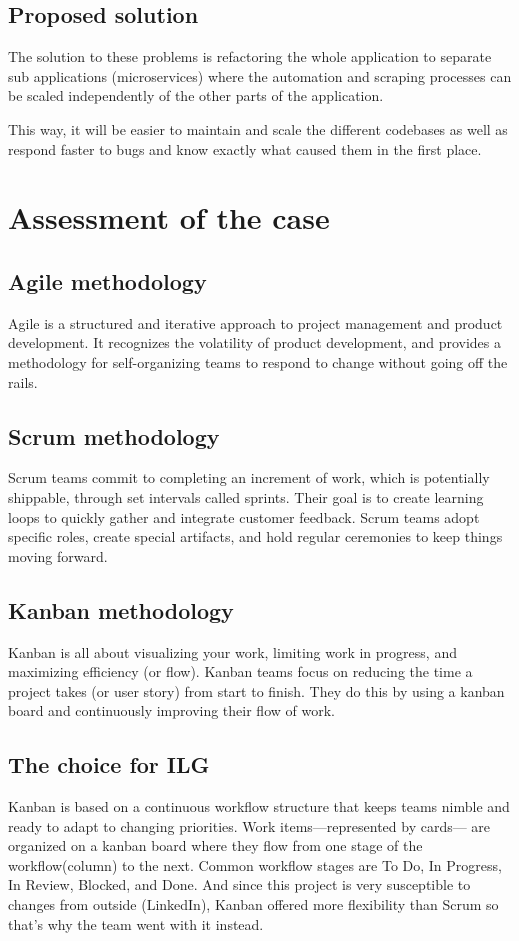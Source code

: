 \subsection{Proposed solution}
The solution to these problems is refactoring the whole application to separate sub applications (microservices) where the automation and scraping processes can be scaled independently of the other parts of the application.

\medskip
This way, it will be easier to maintain and scale the different codebases as well as respond faster to bugs and know exactly what caused them in the first place.


\newpage
\section{Assessment of the case}
\subsection{Agile methodology}
Agile is a structured and iterative approach to project management and product development. It recognizes the volatility of product development, and provides a methodology for self-organizing teams to respond to change without going off the rails.
\subsection{Scrum methodology}
Scrum teams commit to completing an increment of work, which is potentially shippable, through set intervals called sprints. Their goal is to create learning loops to quickly gather and integrate customer feedback. Scrum teams adopt specific roles, create special artifacts, and hold regular ceremonies to keep things moving forward.
\subsection{Kanban methodology}
Kanban is all about visualizing your work, limiting work in progress, and maximizing efficiency (or flow). Kanban teams focus on reducing the time a project takes (or user story) from start to finish. They do this by using a kanban board and continuously improving their flow of work.
\subsection{The choice for ILG}
Kanban is based on a continuous workflow structure that keeps teams nimble and ready to adapt to changing priorities. Work items—represented by cards— are organized on a kanban board where they flow from one stage of the workflow(column) to the next. Common workflow stages are To Do, In Progress, In Review, Blocked, and Done. And since this project is very susceptible to changes from outside (LinkedIn), Kanban offered more flexibility than Scrum so that’s why the team went with it instead.

